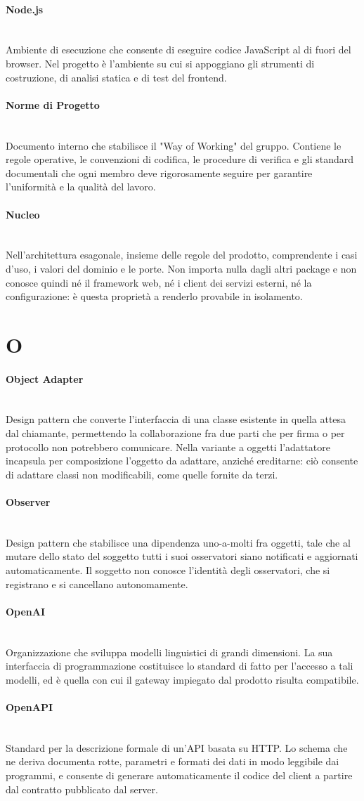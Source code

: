 \documentclass[a4paper, 10pt, colorlinks=true, linkcolor=black, urlcolor=blue, citecolor=blue, hidelinks]{article}
\newcommand{\glossaryterm}[2]{
    \paragraph{#1 \label{term:#1}} \mbox{} \\
    #2
    \vspace{0.5em}
}
\begin{document}
\glossaryterm{Node.js}{Ambiente di esecuzione che consente di eseguire codice JavaScript al di fuori del browser. Nel progetto è l'ambiente su cui si appoggiano gli strumenti di costruzione, di analisi statica e di test del frontend.}

\glossaryterm{Norme di Progetto}{Documento interno che stabilisce il "Way of Working" del gruppo. Contiene le regole operative, le convenzioni di codifica, le procedure di verifica e gli standard documentali che ogni membro deve rigorosamente seguire per garantire l'uniformità e la qualità del lavoro.}

\glossaryterm{Nucleo}{Nell'architettura esagonale, insieme delle regole del prodotto, comprendente i casi d'uso, i valori del dominio e le porte. Non importa nulla dagli altri package e non conosce quindi né il framework web, né i client dei servizi esterni, né la configurazione: è questa proprietà a renderlo provabile in isolamento.}

\newpage

\section*{O}

\glossaryterm{Object Adapter}{Design pattern che converte l'interfaccia di una classe esistente in quella attesa dal chiamante, permettendo la collaborazione fra due parti che per firma o per protocollo non potrebbero comunicare. Nella variante a oggetti l'adattatore incapsula per composizione l'oggetto da adattare, anziché ereditarne: ciò consente di adattare classi non modificabili, come quelle fornite da terzi.}

\glossaryterm{Observer}{Design pattern che stabilisce una dipendenza uno-a-molti fra oggetti, tale che al mutare dello stato del soggetto tutti i suoi osservatori siano notificati e aggiornati automaticamente. Il soggetto non conosce l'identità degli osservatori, che si registrano e si cancellano autonomamente.}

\glossaryterm{OpenAI}{Organizzazione che sviluppa modelli linguistici di grandi dimensioni. La sua interfaccia di programmazione costituisce lo standard di fatto per l'accesso a tali modelli, ed è quella con cui il gateway impiegato dal prodotto risulta compatibile.}

\glossaryterm{OpenAPI}{Standard per la descrizione formale di un'API basata su HTTP. Lo schema che ne deriva documenta rotte, parametri e formati dei dati in modo leggibile dai programmi, e consente di generare automaticamente il codice del client a partire dal contratto pubblicato dal server.}
\end{document}
